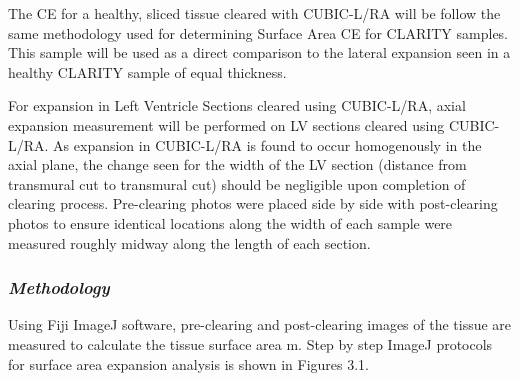 The CE for a healthy, sliced tissue cleared with CUBIC-L/RA will be follow the same methodology used for determining Surface Area CE for CLARITY samples. This sample will be used as a direct comparison to the lateral expansion seen in a healthy CLARITY sample of equal thickness. 

For expansion in Left Ventricle Sections cleared using CUBIC-L/RA, axial expansion measurement will be performed on LV sections cleared using CUBIC-L/RA. As expansion in CUBIC-L/RA is found to occur homogenously in the axial plane, the change seen for the width of the LV section (distance from transmural cut to transmural cut) should be negligible upon completion of clearing process. Pre-clearing photos were placed side by side with post-clearing photos to ensure identical locations along the width of each sample were measured roughly midway along the length of each section.

\subsubsection{\textit{Methodology}}

Using Fiji ImageJ software, pre-clearing and post-clearing images of the tissue are measured to calculate the tissue surface area m. Step by step ImageJ protocols for surface area expansion analysis is shown in Figures 3.1. 

